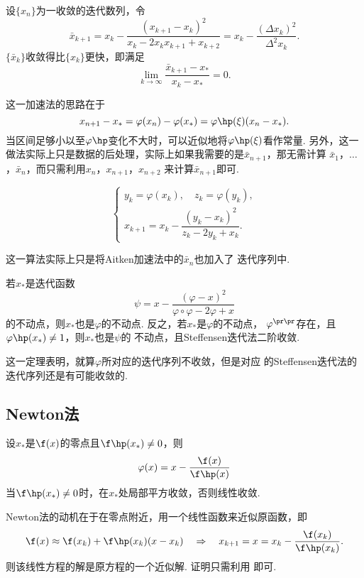   \begin{alg}
    设$\{x_n\}$为一收敛的迭代数列，令
    \[
      \bar{x}_{k+1} = x_k - \frac{(x_{k+1}-x_k)^2}{x_k-2x_kx_{k+1}+x_{k+2}}
      = x_k - \frac{(\Delta x_k)^2}{\Delta^2x_k}.
    \]
    $\{\bar{x}_k\}$收敛得比$\{x_k\}$更快，即满足
    \[
      \lim_{k\to\infty}\frac{\bar{x}_{k+1}-x_*}{x_k-x_*} = 0.
    \]
  \end{alg}
  \remark
    这一加速法的思路在于
    \[
      x_{n+1}-x_* = \varphi(x_n) - \varphi(x_*) = \varphi\hp(\xi)(x_n-x_*).
    \]
    当区间足够小以至$\varphi\hp$变化不大时，可以近似地将$\varphi\hp(\xi)$看作常量.
    另外，这一做法实际上只是数据的后处理，实际上如果我需要的是$\bar{x}_{n+1}$，那无需计算
    $\bar{x}_1$，$\dots$，$\bar{x}_n$，而只需利用$x_{n}$，$x_{n+1}$，$x_{n+2}$
    来计算$\bar{x}_{n+1}$即可.

  \begin{alg}[Steffensen迭代法]
    \[\begin{cases}
      y_k = \varphi(x_k),\quad z_k = \varphi(y_k), \\
      x_{k+1} = x_k - \dfrac{(y_k-x_k)^2}{z_k-2y_k+x_k}.
    \end{cases}\]
  \end{alg}
  \remark
    这一算法实际上只是将Aitken加速法中的$\bar{x}_n$也加入了
    迭代序列中.

  \begin{thm}[Steffensen迭代法]
    若$x_*$是迭代函数
    \[
      \psi = x - \frac{(\varphi - x)^2}{\varphi\circ\varphi - 2\varphi + x}
    \]
    的不动点，则$x_*$也是$\varphi$的不动点. 反之，若$x_*$是$\varphi$的不动点，
    $\varphi^{\pr\pr}$存在，且$\varphi\hp(x_*)\ne 1$，则$x_*$也是$\psi$的
    不动点，且Steffensen迭代法二阶收敛.
  \end{thm}
  \remark
    这一定理表明，就算$\varphi$所对应的迭代序列不收敛，但是对应
    的Steffensen迭代法的迭代序列还是有可能收敛的.

\subsection{Newton法}
  \begin{thm}[Newton法]
    设$x_*$是$\f(x)$的零点且$\f\hp(x_*)\ne 0$，则
    \[
      \varphi(x) = x - \frac{\f(x)}{\f\hp(x)}
    \]
    当$\f\hp(x_*)\ne 0$时，在$x_*$处局部平方收敛，否则线性收敛.
  \end{thm}
  \remark
    Newton法的动机在于在零点附近，用一个线性函数来近似原函数，即
    \[
      \f(x) \approx \f(x_k) + \f\hp(x_k)(x-x_k) \quad\Rightarrow\quad
      x_{k+1} = x = x_k - \frac{\f(x_k)}{\f\hp(x_k)}.
    \]
    则该线性方程的解是原方程的一个近似解. 证明只需利用
    即可.

